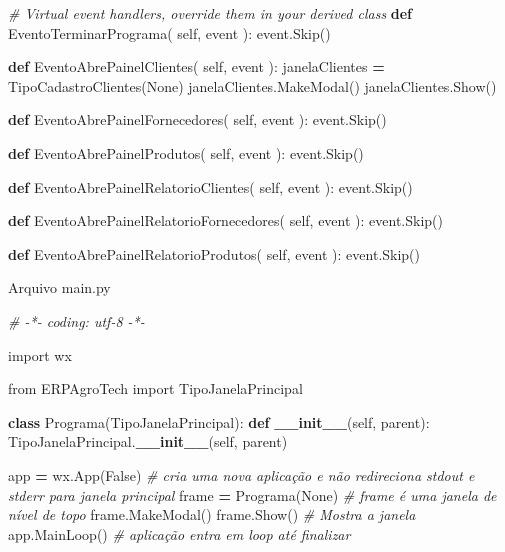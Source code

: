 \documentclass[
]{book}
\newenvironment{Shaded}{\begin{snugshade}}{\end{snugshade}}
\newcommand{\CommentTok}[1]{\textcolor[rgb]{0.56,0.35,0.01}{\textit{#1}}}
\newcommand{\FunctionTok}[1]{\textcolor[rgb]{0.13,0.29,0.53}{\textbf{#1}}}
\newcommand{\ImportTok}[1]{#1}
\newcommand{\KeywordTok}[1]{\textcolor[rgb]{0.13,0.29,0.53}{\textbf{#1}}}
\newcommand{\NormalTok}[1]{#1}
\newcommand{\OperatorTok}[1]{\textcolor[rgb]{0.81,0.36,0.00}{\textbf{#1}}}
\newcommand{\VariableTok}[1]{\textcolor[rgb]{0.00,0.00,0.00}{#1}}
\begin{document}
\begin{Shaded}
\begin{Highlighting}[]
   \CommentTok{\# Virtual event handlers, override them in your derived class}
   \KeywordTok{def}\NormalTok{ EventoTerminarPrograma( }\VariableTok{self}\NormalTok{, event ):}
\NormalTok{       event.Skip()}

   \KeywordTok{def}\NormalTok{ EventoAbrePainelClientes( }\VariableTok{self}\NormalTok{, event ):}
\NormalTok{       janelaClientes }\OperatorTok{=}\NormalTok{ TipoCadastroClientes(}\VariableTok{None}\NormalTok{)}
\NormalTok{       janelaClientes.MakeModal()}
\NormalTok{       janelaClientes.Show()}
       

   \KeywordTok{def}\NormalTok{ EventoAbrePainelFornecedores( }\VariableTok{self}\NormalTok{, event ):}
\NormalTok{       event.Skip()}

   \KeywordTok{def}\NormalTok{ EventoAbrePainelProdutos( }\VariableTok{self}\NormalTok{, event ):}
\NormalTok{       event.Skip()}

   \KeywordTok{def}\NormalTok{ EventoAbrePainelRelatorioClientes( }\VariableTok{self}\NormalTok{, event ):}
\NormalTok{       event.Skip()}

   \KeywordTok{def}\NormalTok{ EventoAbrePainelRelatorioFornecedores( }\VariableTok{self}\NormalTok{, event ):}
\NormalTok{       event.Skip()}

   \KeywordTok{def}\NormalTok{ EventoAbrePainelRelatorioProdutos( }\VariableTok{self}\NormalTok{, event ):}
\NormalTok{       event.Skip()}
\end{Highlighting}
\end{Shaded}

Arquivo main.py

\begin{Shaded}
\begin{Highlighting}[]

\CommentTok{\# {-}*{-} coding: utf{-}8 {-}*{-}}


\ImportTok{import}\NormalTok{ wx}

\ImportTok{from}\NormalTok{ ERPAgroTech }\ImportTok{import}\NormalTok{ TipoJanelaPrincipal}

\KeywordTok{class}\NormalTok{ Programa(TipoJanelaPrincipal):}
    \KeywordTok{def} \FunctionTok{\_\_init\_\_}\NormalTok{(}\VariableTok{self}\NormalTok{, parent):}
\NormalTok{        TipoJanelaPrincipal.}\FunctionTok{\_\_init\_\_}\NormalTok{(}\VariableTok{self}\NormalTok{, parent)}




\NormalTok{app }\OperatorTok{=}\NormalTok{ wx.App(}\VariableTok{False}\NormalTok{)    }\CommentTok{\# cria uma nova aplicação e não redireciona stdout e stderr para janela principal}
\NormalTok{frame }\OperatorTok{=}\NormalTok{ Programa(}\VariableTok{None}\NormalTok{) }\CommentTok{\# frame é uma janela de nível de topo}
\NormalTok{frame.MakeModal()}
\NormalTok{frame.Show()           }\CommentTok{\# Mostra a janela}
\NormalTok{app.MainLoop()         }\CommentTok{\# aplicação entra em loop até finalizar}
\end{Highlighting}
\end{Shaded}
\end{document}
